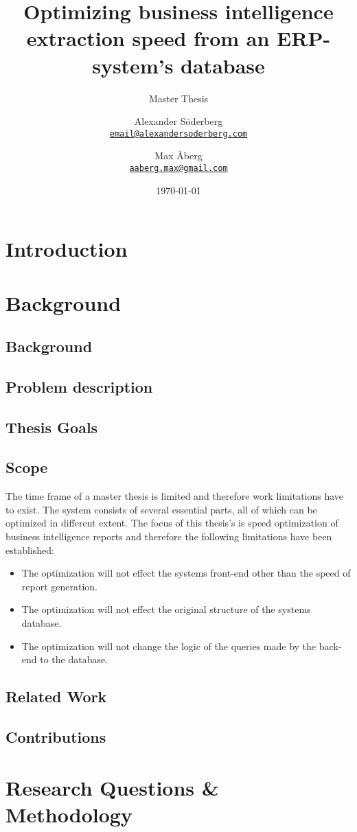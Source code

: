 \documentclass{cslthse-msc}
\author{
	Alexander Söderberg \\
	{\normalsize \href{mailto:email@alexandersoderberg.com}{\texttt{email@alexandersoderberg.com}}}
	\and
	Max Åberg \\
    {\normalsize \href{mailto:aaberg.max@gmail.com}{\texttt{aaberg.max@gmail.com}}}
}
\title{Optimizing business intelligence
extraction speed from an
ERP-system’s database}
\subtitle{Master Thesis}
\date{\today}
\begin{document}
\makefrontmatter
\chapter[Introduction]{Introduction}

\chapter{Background}
\section{Background}

\section{Problem description}
\section{Thesis Goals}
\section{Scope}
The time frame of a master thesis is limited and therefore work limitations have to exist. The system consists of several essential parts, all of which can be optimized in different extent. The focus of this thesis's is speed optimization of business intelligence reports and therefore the following limitations have been established:
\begin{itemize}
\item The optimization will not effect the systems front-end other than the speed of report generation.
\item The optimization will not effect the original structure of the systems database.
\item The optimization will not change the logic of the queries made by the back-end to the database.	
\end{itemize}
\section{Related Work}
\section{Contributions}

\chapter{Research Questions \& Methodology}
\end{document}
